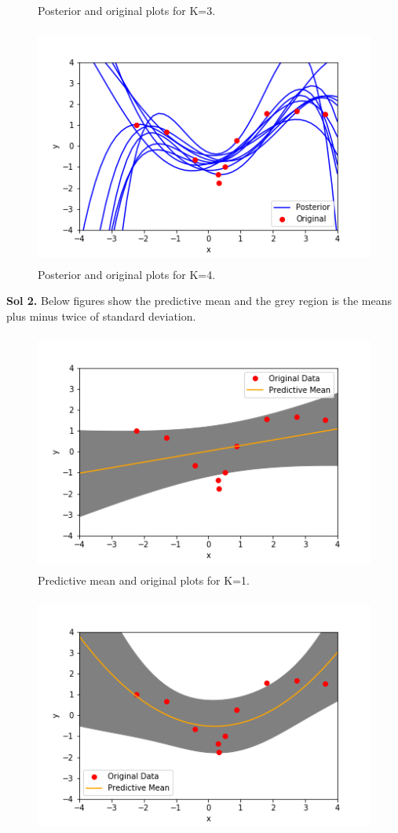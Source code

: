 \documentclass[a4paper,11pt]{article}
\begin{document}
\begin{pmisolution}
\begin{figure}[h]
\caption{Posterior and original plots for K=3.}
\end{figure}
\begin{figure}[h]
\centering
\includegraphics[height=3.1in]{question_6a_4.png}
\caption{Posterior and original plots for K=4.}
\end{figure}
\clearpage
\newpage
\textbf{Sol 2.} Below figures show the predictive mean and the grey region is the means plus minus twice of standard deviation.
\begin{figure}[h]
\centering
\includegraphics[height = 3.1in]{question_6b_1.png}
\caption{Predictive mean and original plots for K=1.} 
\end{figure}
\begin{figure}[h]
\centering
\includegraphics[height=3.1in]{question_6b_2.png}

\end{figure}
\end{pmisolution}
\end{document}
